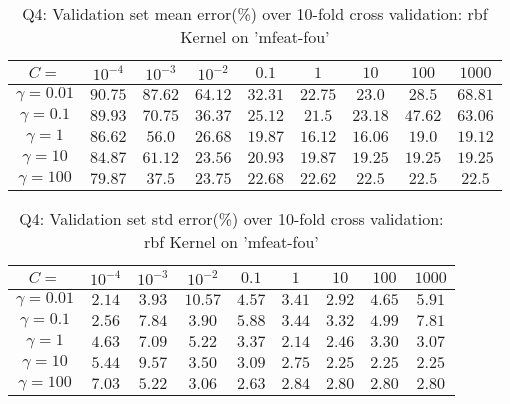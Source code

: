 \begin{table}[ht]
	\centering
	\caption{Q4: Validation set mean error(\%) over 10-fold cross validation: rbf Kernel on 'mfeat-fou'}
	\begin{tabular}[t]{ccccccccc} 
		\hline
		$C=$ 						& $10^{-4}$ & $10^{-3}$ & $10^{-2}$ & $0.1$ 	& $1$ 		& $10$ 		& $100$ 	& $1000$\\ [0.5ex] 
		\hline
		$\gamma=0.01$ 				& $90.75$ 	& $87.62$ 	& $64.12$ 	& $32.31$ 	& $22.75$ 	& $23.0$ 	& $28.5$ 	& $68.81$\\
		$\gamma=0.1$ 				& $89.93$ 	& $70.75$ 	& $36.37$ 	& $25.12$ 	& $21.5$ 	& $23.18$ 	& $47.62$ 	& $63.06$\\
		$\gamma=1$ 					& $86.62$ 	& $56.0$ 	& $26.68$ 	& $19.87$ 	& $16.12$ 	& $16.06$ 	& $19.0$ 	& $19.12$\\
		$\gamma=10$ 				& $84.87$ 	& $61.12$ 	& $23.56$ 	& $20.93$ 	& $19.87$ 	& $19.25$ 	& $19.25$ 	& $19.25$\\
		$\gamma=100$ 				& $79.87$ 	& $37.5$ 	& $23.75$ 	& $22.68$ 	& $22.62$ 	& $22.5$ 	& $22.5$ 	& $22.5$\\[1ex]
		\hline
	\end{tabular}
	\label{tbl:q4_rbf_val_mean}
\end{table}
\begin{table}[ht]
	\centering
	\caption{Q4: Validation set std error(\%) over 10-fold cross validation: rbf Kernel on 'mfeat-fou'}
	\begin{tabular}[t]{ccccccccc} 
		\hline
		$C=$ 						& $10^{-4}$ & $10^{-3}$ & $10^{-2}$ & $0.1$ 	& $1$ 		& $10$ 		& $100$ 	& $1000$\\ [0.5ex] 
		\hline
		$\gamma=0.01$ 				& $2.14$ 	& $3.93$ 	& $10.57$ 	& $4.57$ 	& $3.41$ 	& $2.92$ 	& $4.65$ 	& $5.91$\\
		$\gamma=0.1$ 				& $2.56$ 	& $7.84$ 	& $3.90$ 	& $5.88$ 	& $3.44$ 	& $3.32$ 	& $4.99$ 	& $7.81$\\
		$\gamma=1$ 					& $4.63$ 	& $7.09$ 	& $5.22$ 	& $3.37$ 	& $2.14$ 	& $2.46$ 	& $3.30$ 	& $3.07$\\
		$\gamma=10$ 				& $5.44$ 	& $9.57$ 	& $3.50$ 	& $3.09$ 	& $2.75$ 	& $2.25$ 	& $2.25$ 	& $2.25$\\
		$\gamma=100$ 				& $7.03$ 	& $5.22$ 	& $3.06$ 	& $2.63$ 	& $2.84$ 	& $2.80$ 	& $2.80$ 	& $2.80$\\[1ex]
		\hline
	\end{tabular}
	\label{tbl:q4_rbf_val_std}
\end{table}
